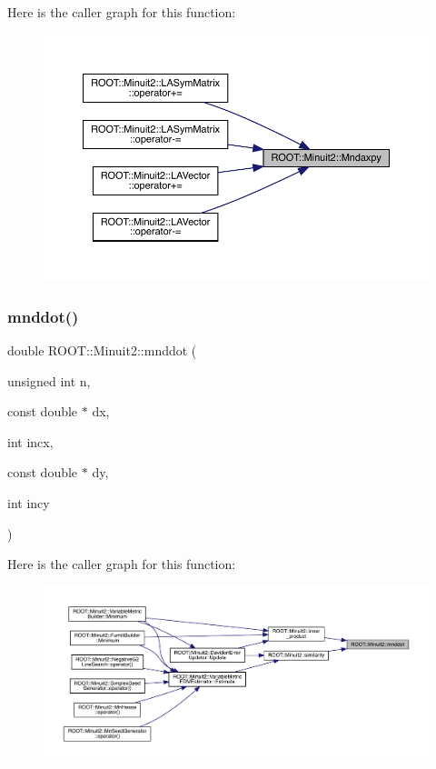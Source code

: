 Here is the caller graph for this function\+:
\nopagebreak
\begin{figure}[H]
\begin{center}
\leavevmode
\includegraphics[width=350pt]{d6/d3a/namespaceROOT_1_1Minuit2_a4784db8e0b280e76eb6f8b00e2b395dd_icgraph}
\end{center}
\end{figure}
\mbox{\label{namespaceROOT_1_1Minuit2_a2226faf256d69bf5b922caad1380c34e}} 
\subsubsection{\texorpdfstring{mnddot()}{mnddot()}}
{\footnotesize\ttfamily double R\+O\+O\+T\+::\+Minuit2\+::mnddot (\begin{DoxyParamCaption}\item[{unsigned int}]{n,  }\item[{const double $\ast$}]{dx,  }\item[{int}]{incx,  }\item[{const double $\ast$}]{dy,  }\item[{int}]{incy }\end{DoxyParamCaption})}

Here is the caller graph for this function\+:
\nopagebreak
\begin{figure}[H]
\begin{center}
\leavevmode
\includegraphics[width=350pt]{d6/d3a/namespaceROOT_1_1Minuit2_a2226faf256d69bf5b922caad1380c34e_icgraph}
\end{center}
\end{figure}
\mbox{\label{namespaceROOT_1_1Minuit2_a8d430fbbb8b24669bd04e922230451ff}} 
